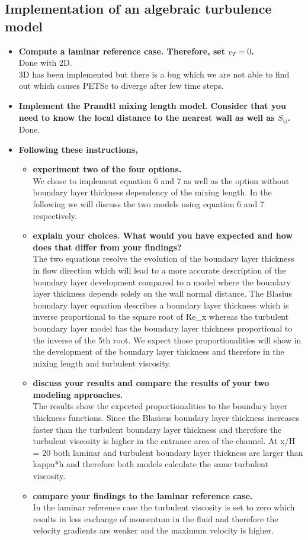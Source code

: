 \documentclass[a4paper]{article}
\begin{document}
\subsection{Implementation of an algebraic turbulence model}
\begin{itemize}
	\item \textbf{Compute a laminar reference case. Therefore, set $v_T = 0$.}\\
	Done with 2D.\\
	3D has been implemented but there is a bug which we are not able to find out which causes PETSc to diverge after few time steps.
	\item \textbf{Implement the Prandtl mixing length model. Consider that you need to know the local distance to the nearest wall as well as $S_{ij}$.}\\
	Done.
	\item \textbf{Following these instructions,}
	\begin{itemize}
		\item \textbf{experiment two of the four options.}\\
		We chose to implement equation 6 and 7 as well as the option without boundary layer thickness dependency of the mixing length. In the following we will discuss the two models using equation 6 and 7 respectively. 
		\item \textbf{explain your choices. What would you have expected and how does that differ from your findings?}\\
The two equations resolve the evolution of the boundary layer thickness in flow direction which will lead to a more accurate description of the boundary layer development compared to a model where the boundary layer thickness depends solely on the wall normal distance. 
The Blasius boundary layer equation describes a boundary layer thickness which is inverse proportional to the square root of Re_x whereas the turbulent boundary layer model has the boundary layer thickness proportional to the inverse of the 5th root. We expect those proportionalities will show in the development of the boundary layer thickness and therefore in the mixing length and turbulent viscosity. 
		\item \textbf{discuss your results and compare the results of your two modeling approaches.}\\
The results show the expected proportionalities to the boundary layer thickness functions. Since the Blasisus boundary layer thickness increases faster than the turbulent boundary layer thickness and therefore the turbulent viscosity is higher in the entrance area of the channel. At x/H = 20 both laminar and turbulent boundary layer thickness are larger than kappa*h and therefore both models calculate the same turbulent viscosity. 
		\item \textbf{compare your findings to the laminar reference case.}\\
In the laminar reference case the turbulent viscosity is set to zero which results in less exchange of momentum in the fluid and therefore the velocity gradients are weaker and the maximum velocity is higher.
	\end{itemize}
\end{itemize}
\end{document}
